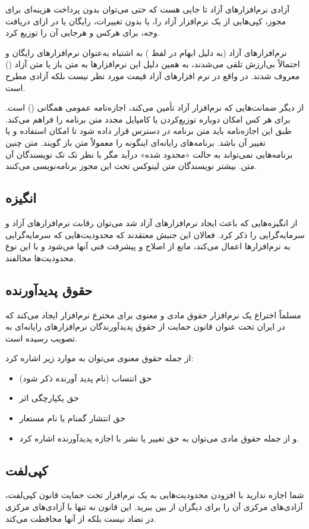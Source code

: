آزادی نرم‌افزارهای آزاد تا جایی هست که حتی می‌توان بدون پرداخت هزینه‌ای برای مجوز، کپی‌هایی از یک نرم‌افزار آزاد را، یا بدون تغییرات، رایگان یا در ازای دریافت وجه، برای هرکس و هرجایی آن را توزیع کرد.

نرم‌افزارهای آزاد (به دلیل ابهام در لفظ ) به اشتباه به‌عنوان نرم‌افزارهای رایگان و احتمالاً بی‌ارزش تلقی می‌شدند، به همین دلیل این نرم‌افزارها به متن باز یا متن آزاد () معروف شدند. در واقع در نرم افزارهای آزاد قیمت مورد نظر نیست بلکه آزادی مطرح است.

از دیگر ضمانت‌هایی که نرم‌افزار آزاد تأمین می‌کند، اجازه‌نامه عمومی همگانی () است. 
 برای هر کس امکان دوباره توزیع‌کردن یا کامپایل مجدد متن برنامه را فراهم می‌کند. طبق این اجازه‌نامه باید متن برنامه در دسترس قرار داده شود تا امکان استفاده و یا تغییر آن باشد. برنامه‌های رایانه‌ای اینگونه را معمولاً متن باز گویند. متن چنین برنامه‌هایی نمی‌تواند به حالت «محدود شده» درآید مگر با نظر تک تک نویسندگان آن متن. بیشتر نویسندگان متن لینوکس تحت این مجوز برنامه‌نویسی می‌کنند.
 
\subsection*{انگیزه}
از انگیزه‌هایی که باعث ایجاد نرم‌افزارهای آزاد شد می‌توان رقابت نرم‌افزارهای آزاد و سرمایه‌گرایی را ذکر کرد. فعالان این جنبش معتقدند که محدودیت‌هایی که سرمایه‌گرایی به نرم‌افزارها اعمال می‌کند، مانع از اصلاح و پیشرفت فنی آنها می‌شود و با این نوع محدودیت‌ها مخالفند.
\subsection*{حقوق پدیدآورنده}
مسلماً اختراع یک نرم‌افزار حقوق مادی و معنوی برای مخترع نرم‌افزار ایجاد می‌کند که در ایران تحت عنوان قانون حمایت از حقوق پدیدآورندگان نرم‌افزارهای رایانه‌ای به تصویب رسیده است.

از جمله حقوق معنوی می‌توان به موارد زیر اشاره کرد:
\begin{itemize}
\item حق انتساب (نام پدید آورنده ذکر شود)
\item حق یکپارچگی اثر
\item حق انتشار گمنام یا نام مستعار
\item و از جمله حقوق مادی می‌توان به حق تغییر یا نشر با اجازه پدیدآورنده اشاره کرد.
\end{itemize}
\subsection*{کپی‌لفت}
شما اجازه ندارید با افزودن محدودیت‌هایی به یک نرم‌افزار تحت حمایت قانون کپی‌لفت، آزادی‌های مرکزی آن را برای دیگران از بین ببرید. این قانون نه تنها با آزادی‌های مرکزی در تضاد نیست بلکه از آنها محافظت می‌کند.

